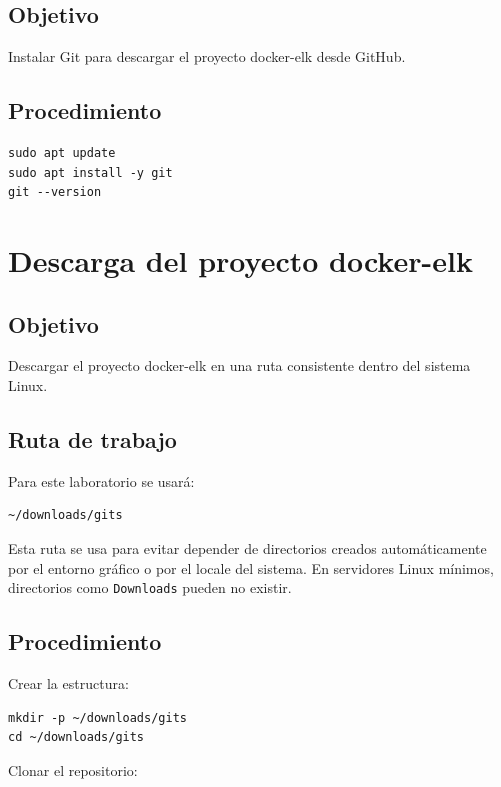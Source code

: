 \documentclass[
  coursetitle={Cómputo Nube y Tecnologías Emergentes},
  coursehours={96},
  coursedate={Verano 2026},
  doctype={Práctica},
  otherlangs={english,french},
  authorname={Lázaro},
  authorsurname={Bustio-Martínez},
  authortitle={PhD},
  role={Profesor Investigador},
  email={lbustio@inaoe.mx},
  phone={5559504000},
  ext={7459},
  institution={Instituto Nacional de Astrofísica, Óptica y Electrónica (INAOE)},
  department={Maestría en Ciencias en Tecnologías de Seguridad},
  address={Luis Enrique Erro 1, Sta. Ma. Tonantzintla, San Andrés Cholula, CP 72840, Puebla, México},
  margin={0.5in}
]{../../lbustio_lecture_notes}
\begin{document}
\subsection{Objetivo}

Instalar Git para descargar el proyecto docker-elk desde GitHub.

\subsection{Procedimiento}

\begin{lstlisting}
sudo apt update
sudo apt install -y git
git --version
\end{lstlisting}

\section{Descarga del proyecto docker-elk}

\subsection{Objetivo}

Descargar el proyecto docker-elk en una ruta consistente dentro del sistema Linux.

\subsection{Ruta de trabajo}

Para este laboratorio se usará:

\begin{verbatim}
~/downloads/gits
\end{verbatim}

Esta ruta se usa para evitar depender de directorios creados automáticamente por el entorno gráfico o por el locale del sistema. En servidores Linux mínimos, directorios como \texttt{Downloads} pueden no existir.

\subsection{Procedimiento}

Crear la estructura:

\begin{lstlisting}
mkdir -p ~/downloads/gits
cd ~/downloads/gits
\end{lstlisting}

Clonar el repositorio:
\end{document}

